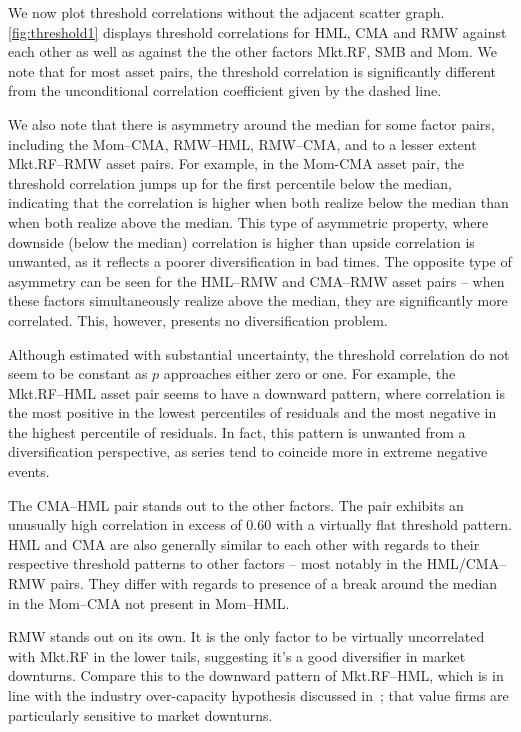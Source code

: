We now plot threshold correlations without the adjacent scatter graph. \autoref{fig:threshold1} displays threshold correlations for HML, CMA and RMW against each other as well as against the the other factors Mkt.RF, SMB and Mom. We note that for most asset pairs, the threshold correlation is significantly different from the unconditional correlation coefficient given by the dashed line.

We also note that there is asymmetry around the median for some factor pairs, including the Mom--CMA, RMW--HML, RMW--CMA, and to a lesser extent Mkt.RF--RMW asset pairs. For example, in the Mom-CMA asset pair, the threshold correlation jumps up for the first percentile below the median, indicating that the correlation is higher when both realize below the median than when both realize above the median. This type of asymmetric property, where downside (below the median) correlation is higher than upside correlation is unwanted, as it reflects a poorer diversification in bad times. The opposite type of asymmetry can be seen for the HML--RMW and CMA--RMW asset pairs -- when these factors simultaneously realize above the median, they are significantly more correlated. This, however, presents no diversification problem.

Although estimated with substantial uncertainty, the threshold correlation do not seem to be constant as $p$ approaches either zero or one. For example, the Mkt.RF--HML asset pair seems to have a downward pattern, where correlation is the most positive in the lowest percentiles of residuals and the most negative in the highest percentile of residuals. In fact, this pattern is unwanted from a diversification perspective, as series tend to coincide more in extreme negative events. 

The CMA--HML pair stands out to the other factors. The pair exhibits an unusually high correlation in excess of $0.60$ with a virtually flat threshold pattern. HML and CMA are also generally similar to each other with regards to their respective threshold patterns to other factors -- most notably in the HML/CMA--RMW pairs. They differ with regards to presence of a break around the median in the Mom--CMA not present in Mom--HML.

RMW stands out on its own. It is the only factor to be virtually uncorrelated with Mkt.RF in the lower tails, suggesting it's a good diversifier in market downturns. Compare this to the downward pattern of Mkt.RF--HML, which is in line with the industry over-capacity hypothesis discussed in~\autocite{sec:literature}; that value firms are particularly sensitive to market downturns.

